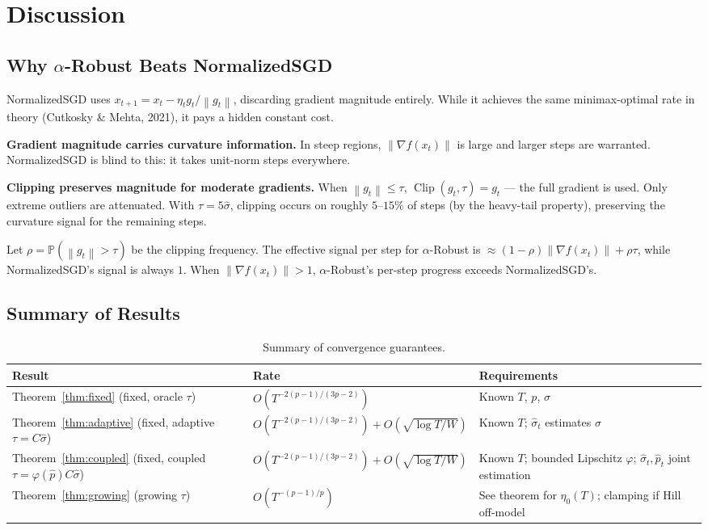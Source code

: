\documentclass[11pt]{article}
\theoremstyle{definition}
\newcommand{\Prob}{\mathbb{P}}
\newcommand{\norm}[1]{\left\| #1 \right\|}
\newcommand{\clip}{\operatorname{Clip}}
\newcommand{\phat}{\hat{p}}
\newcommand{\shat}{\hat{\sigma}}
\begin{document}
\section{Discussion}
\label{sec:discussion}

\subsection{Why $\alpha$-Robust Beats NormalizedSGD}

NormalizedSGD uses $x_{t+1} = x_t - \eta_t g_t/\norm{g_t}$, discarding gradient
magnitude entirely. While it achieves the same minimax-optimal rate in theory
(Cutkosky \& Mehta, 2021), it pays a hidden constant cost.

\textbf{Gradient magnitude carries curvature information.} In steep regions,
$\norm{\nabla f(x_t)}$ is large and larger steps are warranted. NormalizedSGD
is blind to this: it takes unit-norm steps everywhere.

\textbf{Clipping preserves magnitude for moderate gradients.} When
$\norm{g_t} \leq \tau$, $\clip(g_t, \tau) = g_t$ --- the full gradient is used.
Only extreme outliers are attenuated. With $\tau = 5\shat$, clipping occurs
on roughly $5$--$15\%$ of steps (by the heavy-tail property), preserving the
curvature signal for the remaining steps.

Let $\rho = \Prob(\norm{g_t} > \tau)$ be the clipping frequency. The effective
signal per step for $\alpha$-Robust is
$\approx (1-\rho)\norm{\nabla f(x_t)} + \rho\tau$, while NormalizedSGD's signal
is always $1$. When $\norm{\nabla f(x_t)} > 1$, $\alpha$-Robust's per-step
progress exceeds NormalizedSGD's.


\subsection{Summary of Results}

\begin{table}[h]
\centering
\renewcommand{\arraystretch}{1.3}
\begin{tabular}{lll}
\toprule
\textbf{Result} & \textbf{Rate} & \textbf{Requirements} \\
\midrule
Theorem~\ref{thm:fixed} (fixed, oracle $\tau$)
  & $O(T^{-2(p-1)/(3p-2)})$
  & Known $T$, $p$, $\sigma$ \\
Theorem~\ref{thm:adaptive} (fixed, adaptive $\tau = C\shat$)
  & $O(T^{-2(p-1)/(3p-2)}) + O(\sqrt{\log T/W})$
  & Known $T$; $\shat_t$ estimates $\sigma$ \\
Theorem~\ref{thm:coupled} (fixed, coupled $\tau = \varphi(\phat) C\shat$)
  & $O(T^{-2(p-1)/(3p-2)}) + O(\sqrt{\log T/W})$
  & Known $T$; bounded Lipschitz $\varphi$;
    $\shat_t,\phat_t$ joint estimation \\
Theorem~\ref{thm:growing} (growing $\tau$)
  & $O(T^{-(p-1)/p})$
  & See theorem for $\eta_0(T)$; clamping if Hill off-model \\
\bottomrule
\end{tabular}
\caption{Summary of convergence guarantees.}
\end{table}
\end{document}
